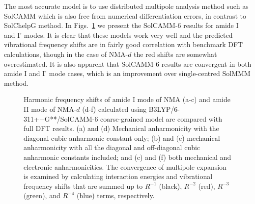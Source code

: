 \documentclass[b5paper,oneside,fleqn,11pt]{book}
\begin{document}
\begin{refsection}
The most accurate model is to use
distributed multipole analysis method such as SolCAMM
which is also free from numerical differentiation errors,
in contrast to SolChelpG method.
In Figs.~\ref{f:solcamm} we present the SolCAMM-6 results 
for amide I and I' modes. It is clear that
these models work very well and the predicted 
vibrational frequency shifts are in fairly good correlation
with benchmark DFT calculations, though in the case of NMA-$d$
the red shifts are somewhat overestimated.
It is also apparent that SolCAMM-6 results are
convergent in both amide I and I' mode cases, which is
an improvement over single\hyp{}centred SolMMM method.
%
\begin{figure}[t!]
\centering
\setlength\fboxsep{0.4pt}
\setlength\fboxrule{0.5pt}
\caption{
Harmonic frequency shifts of amide I mode of NMA (a-c) and amide II mode
of NMA-$d$ (d-f) calculated using
B3LYP/6-311++G**/SolCAMM-6 coarse\hyp{}grained model
are compared with full DFT results. (a) and (d) Mechanical anharmonicity with the
diagonal cubic anharmonic constant only; (b) and (e) mechanical anharmonicity with
all the diagonal and off\hyp{}diagonal cubic anharmonic constants included; and
(c) and (f) both mechanical and electronic anharmonicities.
The convergence of multipole
expansion is examined by calculating interaction energies and vibrational frequency
shifts that are summed up to $R^{-1}$ (black), $R^{-2}$ (red), $R^{-3}$ (green), and
$R^{-4}$ (blue) terms, respectively.
\label{f:solcamm}}
\end{figure}
%


\end{refsection}
\end{document}
